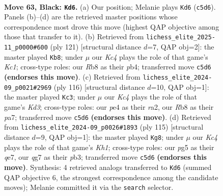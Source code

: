 \documentclass[11pt]{article}
\begin{document}
\clearpage

\begin{figure}[p]\centering
\begin{subfigure}{0.46\textwidth}\centering
\resizebox{\linewidth}{!}{%
\newchessgame
\chessboard[
  setfen={1r6/6Q1/8/2k3P1/4P2P/8/2K5/8 b - - 12 63},
  showmover=false,
  pgfstyle=straightmove, color=movearrow, markmove={c5-d6}
]}
\caption{}
\end{subfigure}\hfill
\begin{subfigure}{0.46\textwidth}\centering
\resizebox{\linewidth}{!}{%
\newchessgame
\chessboard[
  setfen={2k5/6Q1/8/3K4/1P6/P5P1/2B2P2/8 b - - 10 61},
  showmover=false,
  pgfstyle=straightmove, color=movearrow, markmove={c8-b8}
]}
\caption{}
\end{subfigure}
\\[4pt]
\begin{subfigure}{0.46\textwidth}\centering
\resizebox{\linewidth}{!}{%
\newchessgame
\chessboard[
  setfen={8/pp6/2p5/8/6k1/3K4/r7/8 w - - 0 59},
  showmover=false,
  pgfstyle=straightmove, color=movearrow, markmove={d3-c3}
]}
\caption{}
\end{subfigure}\hfill
\begin{subfigure}{0.46\textwidth}\centering
\resizebox{\linewidth}{!}{%
\newchessgame
\chessboard[
  setfen={7k/4Q3/7p/4K2P/8/1P6/2P5/8 b - - 14 58},
  showmover=false,
  pgfstyle=straightmove, color=movearrow, markmove={h8-g8}
]}
\caption{}
\end{subfigure}
\caption{\textbf{Move 63, Black: \texttt{Kd6}.} (a) Our position; Melanie plays \texttt{Kd6} (\texttt{c5d6}). Panels (b)--(d) are the retrieved master positions whose correspondence most drove this move (highest QAP objective among those that transfer to it). (b) Retrieved from \texttt{lichess\_elite\_2025-11\_p0000\#600} (ply 121) [structural distance $d$=7, QAP obj=2]: the master played \texttt{Kb8}; under $\mu$ our \emph{Kc4} plays the role of that game's \emph{Kc1}; cross-type roles: our \emph{R}b8 as their \emph{p}b4; transferred move \texttt{c5d6} \textbf{(endorses this move)}. (c) Retrieved from \texttt{lichess\_elite\_2024-09\_p0021\#2969} (ply 116) [structural distance $d$=10, QAP obj=1]: the master played \texttt{Kc3}; under $\mu$ our \emph{Kc4} plays the role of that game's \emph{Kd3}; cross-type roles: our \emph{p}e4 as their \emph{r}a2, our \emph{R}b8 as their \emph{p}a7; transferred move \texttt{c5d6} \textbf{(endorses this move)}. (d) Retrieved from \texttt{lichess\_elite\_2024-09\_p0026\#1893} (ply 115) [structural distance $d$=9, QAP obj=1]: the master played \texttt{Kg8}; under $\mu$ our \emph{Kc4} plays the role of that game's \emph{Kh1}; cross-type roles: our \emph{p}g5 as their \emph{q}e7, our \emph{q}g7 as their \emph{p}b3; transferred move \texttt{c5d6} \textbf{(endorses this move)}. Synthesis: 4 retrieved analogs transferred to \texttt{Kd6} (summed QAP objective 6, the strongest correspondence among the candidate moves); Melanie committed it via the \texttt{search} selector.}
\label{fig:thought-m125}
\end{figure}
\end{document}
